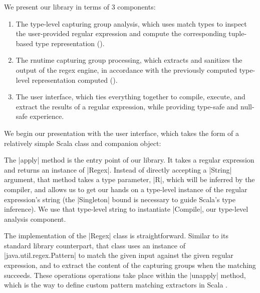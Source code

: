 We present our library in terms of 3 components:

\begin{enumerate}
  \item The type-level capturing group analysis, which uses match types to inspect the user-provided regular expression and compute the corresponding tuple-based type representation ().

  \item The rnutime capturing group processing, which extracts and sanitizes the output of the regex engine, in accordance with the previously computed type-level representation computed ().

  \item The user interface, which ties everything together to compile, execute, and extract the results of a regular expression, while providing type-safe and null-safe experience.
\end{enumerate}

We begin our presentation with the user interface, which takes the form of a relatively simple Scala class and companion object:

\regexUserLevel
%

The |apply| method is the entry point of our library.
It takes a regular expression and returns an instance of |Regex|.
Instead of directly accepting a |String| argument, that method takes a type parameter, |R|, which will be inferred by the compiler, and allows us to get our hands on a type-level instance of the regular expression's string (the |Singleton| bound is necessary to guide Scala's type inference).
We use that type-level string to instantiate |Compile|, our type-level analysis component.

The implementation of the |Regex| class is straightforward.
Similar to its standard library counterpart, that class uses an instance of |java.util.regex.Pattern| to match the given input against the given regular expression, and to extract the content of the capturing groups when the matching succeeds.
These operations operations take place within the |unapply| method, which is the way to define custom pattern matching extractors in Scala \citep{emir2007matching}.

